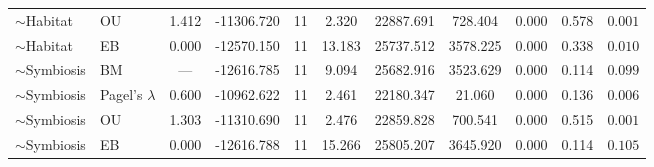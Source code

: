 \begin{table}
\begin{tabular}[t]{llccccccccc}
$\sim$Habitat & OU & 1.412 & -11306.720 & 11 & 2.320 & 22887.691 & 728.404 & 0.000 & 0.578 & $0.001$\\
$\sim$Habitat & EB & 0.000 & -12570.150 & 11 & 13.183 & 25737.512 & 3578.225 & 0.000 & 0.338 & $0.010$\\
\addlinespace
$\sim$Symbiosis & BM & --- & -12616.785 & 11 & 9.094 & 25682.916 & 3523.629 & 0.000 & 0.114 & $0.099$\\
$\sim$Symbiosis & Pagel's $\lambda$ & 0.600 & -10962.622 & 11 & 2.461 & 22180.347 & 21.060 & 0.000 & 0.136 & $0.006$\\
$\sim$Symbiosis & OU & 1.303 & -11310.690 & 11 & 2.476 & 22859.828 & 700.541 & 0.000 & 0.515 & $0.001$\\
$\sim$Symbiosis & EB & 0.000 & -12616.788 & 11 & 15.266 & 25805.207 & 3645.920 & 0.000 & 0.114 & $0.105$\\
\bottomrule
\end{tabular}
\end{table}